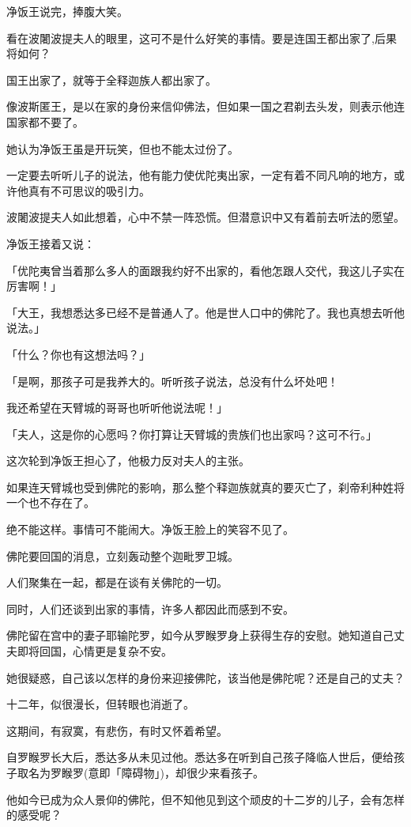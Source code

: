 \documentclass[twoside,openany]{book}
\begin{document}
净饭王说完，捧腹大笑。

看在波闍波提夫人的眼里，这可不是什么好笑的事情。要是连国王都出家了,后果将如何？

国王出家了，就等于全释迦族人都出家了。

像波斯匿王，是以在家的身份来信仰佛法，但如果一国之君剃去头发，则表示他连国家都不要了。

她认为净饭王虽是开玩笑，但也不能太过份了。

一定要去听听儿子的说法，他有能力使优陀夷出家，一定有着不同凡响的地方，或许他真有不可思议的吸引力。

波闍波提夫人如此想着，心中不禁一阵恐慌。但潜意识中又有着前去听法的愿望。

净饭王接着又说：

「优陀夷曾当着那么多人的面跟我约好不出家的，看他怎跟人交代，我这儿子实在厉害啊！」

「大王，我想悉达多已经不是普通人了。他是世人口中的佛陀了。我也真想去听他说法。」

「什么？你也有这想法吗？」

「是啊，那孩子可是我养大的。听听孩子说法，总没有什么坏处吧！

我还希望在天臂城的哥哥也听听他说法呢！」

「夫人，这是你的心愿吗？你打算让天臂城的贵族们也出家吗？这可不行。」

这次轮到净饭王担心了，他极力反对夫人的主张。

如果连天臂城也受到佛陀的影响，那么整个释迦族就真的要灭亡了，刹帝利种姓将一个也不存在了。

绝不能这样。事情可不能闹大。净饭王脸上的笑容不见了。

佛陀要回国的消息，立刻轰动整个迦毗罗卫城。

人们聚集在一起，都是在谈有关佛陀的一切。

同时，人们还谈到出家的事情，许多人都因此而感到不安。

佛陀留在宫中的妻子耶输陀罗，如今从罗睺罗身上获得生存的安慰。她知道自己丈夫即将回国，心情更是复杂不安。

她很疑惑，自己该以怎样的身份来迎接佛陀，该当他是佛陀呢？还是自己的丈夫？

十二年，似很漫长，但转眼也消逝了。

这期间，有寂寞，有悲伤，有时又怀着希望。

自罗睺罗长大后，悉达多从未见过他。悉达多在听到自己孩子降临人世后，便给孩子取名为罗睺罗(意即「障碍物」)，却很少来看孩子。

他如今已成为众人景仰的佛陀，但不知他见到这个顽皮的十二岁的儿子，会有怎样的感受呢？
\end{document}
